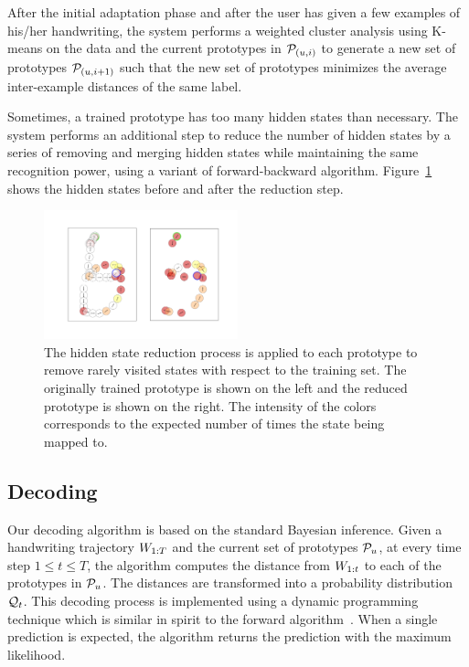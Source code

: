 \documentclass{sigchi}
\begin{document}
After the initial adaptation phase and after the user has given a few
examples of his/her handwriting, the system performs a weighted cluster
analysis using K-means on the data and the current prototypes in
$\mathcal{P}_{(u,i)}$ to generate a new set of prototypes
$\mathcal{P}_{(u,i+1)}$ such that the new set of prototypes minimizes the
average inter-example distances of the same label. 

Sometimes, a trained prototype has too many hidden states than
necessary. The system performs an additional step to reduce the number
of hidden states by a series of removing and merging hidden states
while maintaining the same recognition power, using a variant of
forward-backward algorithm. Figure~\ref{fig:state_reduction} shows the
hidden states before and after the reduction step.

\begin{figure}[h]
  \centering
  \includegraphics[width=0.5\textwidth] {figures/state_reduction.png}
  \caption{The hidden state reduction process is applied to each
    prototype to remove rarely visited states with respect to the
    training set. The originally trained prototype is shown on the
    left and the reduced prototype is shown on the right. The
    intensity of the colors corresponds to the expected number of
    times the state being mapped to. }
  \label{fig:state_reduction}
\end{figure}

\subsection{Decoding}

Our decoding algorithm is based on the standard Bayesian inference.
Given a handwriting trajectory $W_{1:{T}}$ and the current set of
prototypes $\mathcal{P}_u$, at every time step $1 \le t \le T$, the
algorithm computes the distance from $W_{1:{t}}$ to each of the
prototypes in $\mathcal{P}_u$. The distances are transformed into a
probability distribution $\mathcal{Q}_{t}$. This decoding process is
implemented using a dynamic programming technique which is similar in
spirit to the forward algorithm~\cite{Bilmes97}. When a single prediction is expected,
the algorithm returns the prediction with the maximum likelihood.
\end{document}
